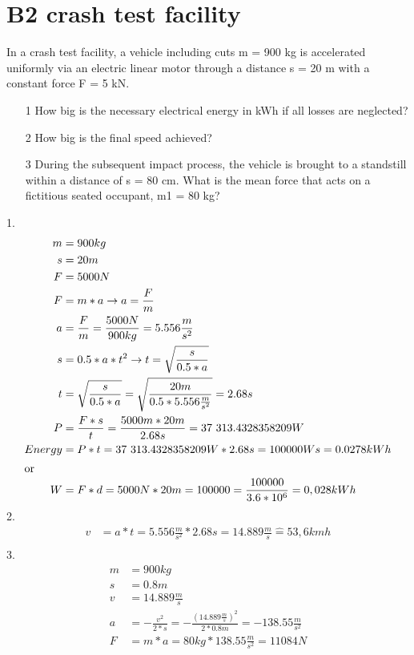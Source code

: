 \documentclass[10pt,ngerman]{scrartcl}
\begin{document}
\section{B2 crash test facility}
In a crash test facility, a vehicle including cuts m = 900 kg is accelerated uniformly via an electric linear motor through a distance s = 20 m with a constant force F = 5 kN.
\begin{enumerate}
	\item[1] How big is the necessary electrical energy in kWh if all losses are neglected?
	\item[2] How big is the final speed achieved?
	\item[3] During the subsequent impact process, the vehicle is brought to a standstill within a distance of s = 80 cm. What is the mean force that acts on a fictitious seated occupant, m1 = 80 kg?
\end{enumerate}
1. 
	\begin{align*}
			m &= 900 kg \\
			s &= 20 m \\
			F &= 5000N \\
			F &= m * a \rightarrow a = \frac{F}{m} \\
			a &= \frac{F}{m} = \frac{5000N}{900kg} = 5.556 \frac{m}{s^{2}} \\
			s &= 0.5 * a * t^{2} \rightarrow t = \sqrt{\frac{s}{0.5 * a}} \\
			t &= \sqrt{\frac{s}{0.5*a}} = \sqrt{\frac{20m}{0.5 * 5.556 \frac{m}{s^{2}}}} = 2.68s \\
			P &= \frac{F * s}{t} = \frac{5000m * 20 m}{2.68s} = 37 313.4328358209 W \\
			Energy &= P * t = 37 313.4328358209 W * 2.68s = 100000Ws = 0.0278kWh \\
			\intertext{or}
			W &= F * d = 5000N * 20m = 100000 = \frac{100000}{3.6 * 10^6} = 0,028 kWh
	\end{align*}
2.
	\begin{align*}
		v &= a * t = 5.556 \frac{m}{s^{2}} * 2.68s = 14.889 \frac{m}{s} \widehat{=} 53,6 kmh \\		
	\end{align*}
3.
	\begin{align*}
		m &= 900 kg \\
		s &= 0.8 m \\
		v &= 14.889 \frac{m}{s} \\
		a &= - \frac{v^{2}}{2*s} = - \frac{(14.889 \frac{m}{s})^{2}}{2*0.8m} = -138.55 \frac{m}{s^{2}} \\
		F &= m * a = 80 kg * 138.55 \frac{m}{s^{2}} = 11084 N
	\end{align*}
\end{document}
